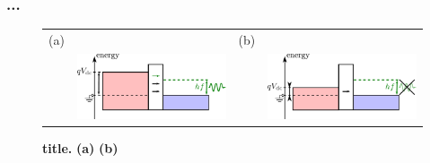 \subsubsection*{...}

\begin{figure}[hptb]
	\begin{center}
		\begin{tabular}{c c c c}
			(a) & & (b) & \\
			& \includegraphics[width = 6.5 cm]{./chap2/noise_schematics_a} &
			& \includegraphics[width = 6.5 cm]{./chap2/noise_schematics_b}  
		\end{tabular}
	\end{center}
	
	\caption{\textbf{title.} \textbf{(a)}  \textbf{(b)} }
	\label{fig: principle schematics}
\end{figure}


